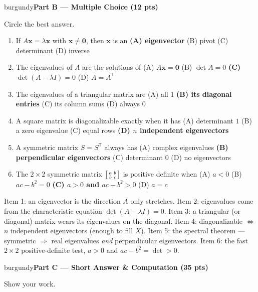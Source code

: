 \documentclass[10pt]{article}
\newcommand{\xx}{\mathbf{x}}
\newcommand{\T}{^{\mathsf T}}
\newcommand{\parthead}[1]{%
  \vspace{6pt}\noindent
  \begin{headlinebox}{burgundy}{\color{white}\bfseries #1}\end{headlinebox}%
  \vspace{4pt}}
\begin{document}
\parthead{Part B --- Multiple Choice (12 pts)}
Circle the best answer.

\begin{enumerate}[leftmargin=1.9em, itemsep=9pt]
  \item If $A\xx=\lambda\xx$ with $\xx\ne\mathbf{0}$, then $\xx$ is an
    \hfill \textbf{(A) eigenvector} \ans{$\leftarrow$} \quad (B) pivot \quad (C) determinant \quad (D) inverse
  \item The eigenvalues of $A$ are the solutions of
    \hfill (A) $A\xx=\mathbf{0}$ \quad (B) $\det A=0$ \quad \textbf{(C) $\det(A-\lambda I)=0$} \ans{$\leftarrow$} \quad (D) $A=A\T$
  \item The eigenvalues of a triangular matrix are
    \hfill (A) all $1$ \quad \textbf{(B) its diagonal entries} \ans{$\leftarrow$} \quad (C) its column sums \quad (D) always $0$
  \item A square matrix is diagonalizable exactly when it has
    \hfill (A) determinant $1$ \quad (B) a zero eigenvalue \quad (C) equal rows \quad \textbf{(D) $n$ independent eigenvectors} \ans{$\leftarrow$}
  \item A symmetric matrix $S=S\T$ always has
    \hfill (A) complex eigenvalues \quad \textbf{(B) perpendicular eigenvectors} \ans{$\leftarrow$} \quad (C) determinant $0$ \quad (D) no eigenvectors
  \item The $2\times2$ symmetric matrix $\begin{bsmallmatrix}a&b\\b&c\end{bsmallmatrix}$ is positive definite when
    \hfill (A) $a<0$ \quad (B) $ac-b^2=0$ \quad \textbf{(C) $a>0$ and $ac-b^2>0$} \ans{$\leftarrow$} \quad (D) $a=c$
\end{enumerate}

\begin{teachernote}
Item 1: an eigenvector is the direction $A$ only stretches. Item 2: eigenvalues come from the characteristic
equation $\det(A-\lambda I)=0$. Item 3: a triangular (or diagonal) matrix wears its eigenvalues on the diagonal.
Item 4: diagonalizable $\Leftrightarrow$ $n$ independent eigenvectors (enough to fill $X$). Item 5: the spectral
theorem --- symmetric $\Rightarrow$ real eigenvalues \emph{and} perpendicular eigenvectors. Item 6: the fast
$2\times2$ positive-definite test, $a>0$ and $ac-b^2=\det>0$.
\end{teachernote}

\parthead{Part C --- Short Answer \& Computation (35 pts)}
Show your work.
\end{document}

